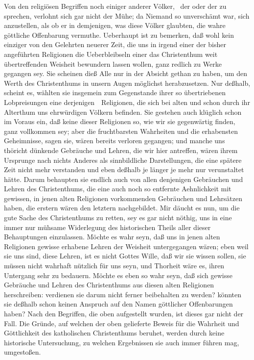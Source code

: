 \begin{aufza}
\item Von den religiösen Begriffen noch einiger anderer Völker, \zB\  der  oder der  zu sprechen, verlohnt sich gar nicht der Mühe; da Niemand so unverschämt war, sich anzustellen, als ob er in demjenigen, was diese Völker glaubten, die wahre göttliche Offenbarung vermuthe. Ueberhaupt ist zu bemerken, daß wohl kein einziger von den Gelehrten neuerer Zeit, die uns in irgend einer der bisher angeführten Religionen die Ueberbleibseln einer das Christenthum weit übertreffenden Weisheit bewundern lassen wollen, ganz redlich zu Werke gegangen sey. Sie scheinen dieß Alle nur in der Absicht gethan zu haben, um den Werth des Christenthums in unsern Augen möglichst herabzusetzen. Nur deßhalb, scheint es, wählten sie insgemein zum Gegenstande ihrer so übertriebenen Lobpreisungen eine derjenigen~\ Religionen, die sich bei alten und schon durch ihr Alterthum uns ehrwürdigen Völkern befinden. Sie gestehen auch klüglich schon im Voraus ein, daß keine dieser Religionen so, wie wir sie gegenwärtig finden, ganz vollkommen sey; aber die fruchtbarsten Wahrheiten und die erhabensten Geheimnisse, sagen sie, wären bereits verloren gegangen; und manche uns thöricht dünkende Gebräuche und Lehren, die wir hier antreffen, wären ihrem Ursprunge nach nichts Anderes als sinnbildliche Darstellungen, die eine spätere Zeit nicht mehr verstanden und eben deßhalb je länger je mehr nur verunstaltet hätte. Darum behaupten sie endlich auch von allen denjenigen Gebräuchen und Lehren des Christenthums, die eine auch noch so entfernte Aehnlichkeit mit gewissen, in jenen alten Religionen vorkommenden Gebräuchen und Lehrsätzen haben, die erstern wären den letztern nachgebildet. Mir däucht es nun, um die gute Sache des Christenthums zu retten, sey es gar nicht nöthig, uns in eine immer nur mühsame Widerlegung des historischen Theils aller dieser Behauptungen einzulassen. Möchte es wahr seyn, daß uns in jenen alten Religionen gewisse erhabene Lehren der Weisheit untergegangen wären; eben weil sie uns  sind, diese Lehren, ist es nicht Gottes Wille, daß wir sie wissen sollen, sie müssen nicht wahrhaft nützlich für uns seyn, und Thorheit wäre es, ihren Untergang sehr zu bedauern. Möchte es eben so wahr seyn, daß sich gewisse Gebräuche und Lehren des Christenthums aus diesen alten Religionen herschreiben: verdienen sie darum nicht ferner beibehalten zu werden? könnten sie deßhalb schon keinen Anspruch auf den Namen göttlicher Offenbarungen haben? Nach den Begriffen, die oben aufgestellt wurden, ist dieses gar nicht der Fall. Die Gründe, auf welchen der oben gelieferte Beweis für die Wahrheit und Göttlichkeit des katholischen Christenthums beruhet, werden durch keine historische Untersuchung, zu welchen Ergebnissen sie auch immer führen mag, umgestoßen.
\end{aufza}


